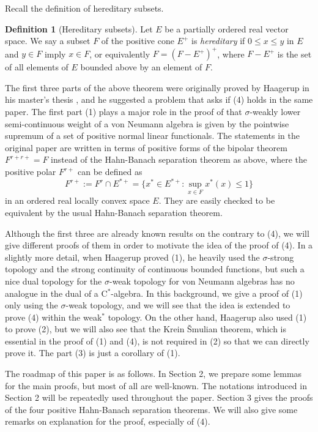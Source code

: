 \documentclass[noamsfonts,a4paper,10pt]{amsart}
\theoremstyle{plain}
\theoremstyle{definition}
\newtheorem{defn}[thm]{Definition}
\theoremstyle{remark}
\begin{document}
Recall the definition of hereditary subsets.

\begin{defn}[Hereditary subsets]
Let $E$ be a partially ordered real vector space.
We say a subset $F$ of the positive cone $E^+$ is \emph{hereditary} if $0\le x\le y$ in $E$ and $y\in F$ imply $x\in F$, or equivalently $F=(F-E^+)^+$, where $F-E^+$ is the set of all elements of $E$ bounded above by an element of $F$.
\end{defn}

The first three parts of the above theorem were originally proved by Haagerup in his master's thesis \cite{MR380438}, and he suggested a problem that asks if (4) holds in the same paper.
The first part (1) plays a major role in the proof of that $\sigma$-weakly lower semi-continuous weight of a von Neumann algebra is given by the pointwise supremum of a set of positive normal linear functionals.
The statements in the original paper are written in terms of positive forms of the bipolar theorem $F^{r+r+}=F$ instead of the Hahn-Banach separation theorem as above, where the positive polar $F^{r+}$ can be defined as
\[F^{r+}:=F^r\cap E^{*+}=\{x^*\in E^{*+}:\sup_{x\in F}x^*(x)\le1\}\]
in an ordered real locally convex space $E$.
They are easily checked to be equivalent by the usual Hahn-Banach separation theorem.

Although the first three are already known results on the contrary to (4), we will give different proofs of them in order to motivate the idea of the proof of (4).
In a slightly more detail, when Haagerup proved (1), he heavily used the $\sigma$-strong topology and the strong continuity of continuous bounded functions, but such a nice dual topology for the $\sigma$-weak topology for von Neumann algebras has no analogue in the dual of a C$^*$-algebra.
In this background, we give a proof of (1) only using the $\sigma$-weak topology, and we will see that the idea is extended to prove (4) within the weak$^*$ topology.
On the other hand, Haagerup also used (1) to prove (2), but we will also see that the Krein \v Smulian theorem, which is essential in the proof of (1) and (4), is not required in (2) so that we can directly prove it.
The part (3) is just a corollary of (1).

The roadmap of this paper is as follows.
In Section 2, we prepare some lemmas for the main proofs, but most of all are well-known.
The notations introduced in Section 2 will be repeatedly used throughout the paper.
Section 3 gives the proofs of the four positive Hahn-Banach separation theorems.
We will also give some remarks on explanation for the proof, especially of (4).
\end{document}
